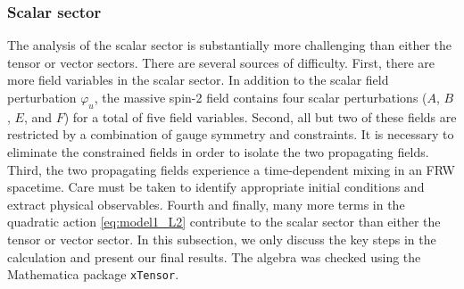 \documentclass[11pt,a4paper]{article}
\begin{document}
\subsubsection{Scalar sector}
\label{sub:model1_scalar_sector}

The analysis of the scalar sector is substantially more challenging than either the tensor or vector sectors.  There are several sources of difficulty.  First, there are more field variables in the scalar sector.  In addition to the scalar field perturbation $\varphi_u$, the massive spin-2 field contains four scalar perturbations ($A$, $B$, $E$, and $F$) for a total of five field variables.  Second, all but two of these fields are restricted by a combination of gauge symmetry and constraints.  It is necessary to eliminate the constrained fields in order to isolate the two propagating fields.  Third, the two propagating fields experience a time-dependent mixing in an FRW spacetime.  
Care must be taken to identify appropriate initial conditions and extract physical observables.  Fourth and finally, many more terms in the quadratic action \eqref{eq:model1_L2} contribute to the scalar sector than either the tensor or vector sector.  In this subsection, we only discuss the key steps in the calculation and present our final results.  The algebra was checked using the Mathematica package \texttt{xTensor}.  
\end{document}

